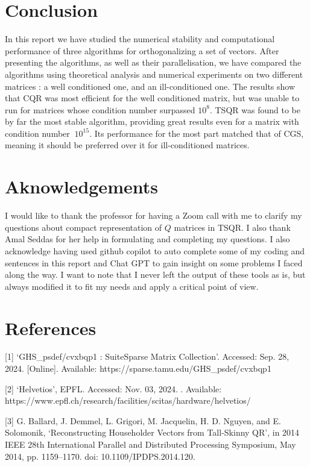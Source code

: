 \documentclass[a4paper, 12pt,oneside]{article}
\begin{document}
	\section{Conclusion}
	In this report we have studied the numerical stability and computational performance of three algorithms for orthogonalizing a set of vectors. After presenting the algorithms, as well as their parallelisation, we have compared the algorithms using theoretical analysis and numerical experiments on two different matrices : a well conditioned one, and an ill-conditioned one. The results show that CQR was most efficient for the well conditioned matrix, but was unable to run for matrices whose condition number surpassed $10^8$. TSQR was found to be by far the most stable algorithm, providing great results even for a matrix with condition number $~10^{15}$. Its performance for the most part matched that of CGS, meaning it should be preferred over it for ill-conditioned matrices. 
	\section*{Aknowledgements}
	I would like to thank the professor for having a Zoom call with me to clarify my questions about compact representation of $Q$ matrices in TSQR. I also thank Amal Seddas for her help in formulating and completing my questions. I also acknowledge having used github copilot to auto complete some of my coding and sentences in this report and Chat GPT to gain insight on some problems I faced along the way. I want to note that I never left the output of these tools as is, but always modified it to fit my needs and apply a critical point of view.
	\section*{References}
	[1] ‘GHS\_psdef/cvxbqp1 : SuiteSparse Matrix Collection’. Accessed: Sep. 28, 2024. [Online]. Available: https://sparse.tamu.edu/GHS\_psdef/cvxbqp1
	
	[2] ‘Helvetios’, EPFL. Accessed: Nov. 03, 2024. \newline [Online]. Available: https://www.epfl.ch/research/facilities/scitas/hardware/helvetios/
	
	[3] G. Ballard, J. Demmel, L. Grigori, M. Jacquelin, H. D. Nguyen, and E. Solomonik, ‘Reconstructing Householder Vectors from Tall-Skinny QR’, in 2014 IEEE 28th International Parallel and Distributed Processing Symposium, May 2014, pp. 1159–1170. doi: 10.1109/IPDPS.2014.120.
\end{document}
